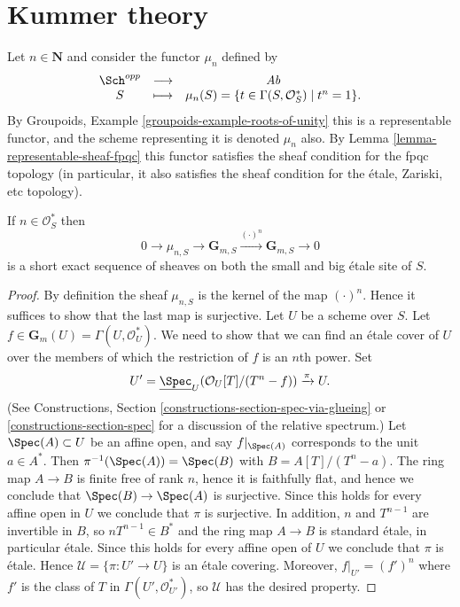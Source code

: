 \section{Kummer theory}
\label{section-kummer}

\noindent
Let $n \in \mathbf{N}$ and consider the functor $\mu_n$ defined by
$$
\begin{matrix}
\Sch^{opp} & \longrightarrow & \textit{Ab} \\
S & \longmapsto &
\mu_n(S)
=
\{t \in \Gamma(S, \mathcal{O}_S^*) \mid t^n = 1 \}.
\end{matrix}
$$
By
Groupoids, Example \ref{groupoids-example-roots-of-unity}
this is a representable functor, and the scheme representing it
is denoted $\mu_n$ also. By
Lemma \ref{lemma-representable-sheaf-fpqc}
this functor satisfies the sheaf condition for the fpqc topology
(in particular, it also satisfies the sheaf condition for the
\'etale, Zariski, etc topology).

\begin{lemma}
\label{lemma-kummer-sequence}
If $n\in \mathcal{O}_S^*$ then
$$
0 \to
\mu_{n, S} \to
\mathbf{G}_{m, S} \xrightarrow{(\cdot)^n}
\mathbf{G}_{m, S} \to 0
$$
is a short exact sequence of sheaves on both the small and
big \'etale site of $S$.
\end{lemma}

\begin{proof}
By definition the sheaf $\mu_{n, S}$ is the kernel of the map
$(\cdot)^n$. Hence it suffices to show that the last map is surjective.
Let $U$ be a scheme over $S$. Let
$f \in \mathbf{G}_m(U) = \Gamma(U, \mathcal{O}_U^*)$.
We need to show that we can find an \'etale cover of
$U$ over the members of which the restriction of $f$ is an $n$th power.
Set
$$
U' =
\underline{\Spec}_U(\mathcal{O}_U[T]/(T^n-f))
\xrightarrow{\pi}
U.
$$
(See
Constructions, Section \ref{constructions-section-spec-via-glueing} or
\ref{constructions-section-spec}
for a discussion of the relative spectrum.)
Let $\Spec(A) \subset U$ be an affine open, and say $f|_{\Spec(A)}$ corresponds
to the unit $a \in A^*$. Then $\pi^{-1}(\Spec(A)) = \Spec(B)$ with
$B = A[T]/(T^n - a)$. The ring map $A \to B$ is finite free of rank $n$,
hence it is faithfully flat, and hence we conclude that
$\Spec(B) \to \Spec(A)$ is surjective. Since this holds for every
affine open in $U$ we conclude that $\pi$ is surjective.
In addition, $n$ and $T^{n - 1}$ are invertible in $B$, so
$nT^{n-1} \in B^*$ and the ring map $A \to B$ is standard \'etale,
in particular \'etale. Since this holds for every affine open of $U$
we conclude that $\pi$ is \'etale. Hence
$\mathcal{U} = \{\pi : U' \to U\}$ is an \'etale covering.
Moreover, $f|_{U'} = (f')^n$ where $f'$ is the class of $T$
in $\Gamma(U', \mathcal{O}_{U'}^*)$, so $\mathcal{U}$ has the desired property.
\end{proof}

